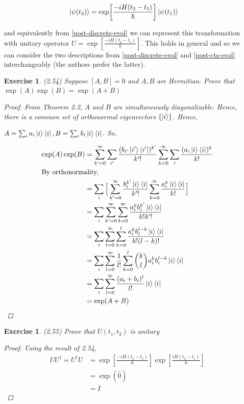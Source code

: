 \documentclass[11pt]{article}
\newcommand\0{\mathbf{0}}
\newcommand\<{\langle}
\renewcommand\>{\rangle}
\newtheorem{exercise}[theorem]{Exercise}
\begin{document}
\begin{align*}
	\ket{\psi(t_2)} &= \exp[\frac{-iH(t_2 - t_1)}{\hbar}] \ket{\psi(t_1)}
\end{align*}

and equivalently from \ref{post-discrete-evol} we can represent this transformation with unitary operator $U = \exp[\frac{-iH(t_2 - t_1)}{\hbar}]$. This holds in general and so we can consider the two descriptions from \ref{post-discrete-evol} and \ref{post-cts-evol} interchangeably (the authors prefer the latter). 

\begin{exercise}
(2.54) Suppose $[A, B] = 0$ and $A, B$ are Hermitian. Prove that $\exp(A)\exp(B) = \exp(A + B)$

\begin{proof}
	From Theorem 2.2, $A$ and $B$ are simultaneously diagonalizable. Hence, there is a common set of orthonormal eigenvectors $\{ \ket{i} \}$. Hence,
	
	$A = \sum_i a_i \ket{i}\bra{i}, B = \sum_i b_i \ket{i}\bra{i}$. So, 
	
	\begin{align*}
	\exp(A)\exp(B) &= \sum_{k'=0}^\infty\sum_{i'} \frac{(b_{i'} \ket{i'}\bra{i'})^{k'}}{k'!}\sum_{k=0}^\infty\sum_{i} \frac{(a_i \ket{i}\bra{i})^k}{k!} \\
	\intertext{By orthonormality,}
	&= \sum_{i}\Big[\sum_{k'=0}^\infty \frac{b_i^{k'} \ket{i}\bra{i}}{k'!}\sum_{k=0}^\infty \frac{a_i^k \ket{i}\bra{i}}{k!}\Big] \\
	&= \sum_{i}\sum_{k'=0}^\infty\sum_{k=0}^\infty \frac{a_i^k b_i^{k'} \ket{i}\bra{i}}{k!k'!}\\
	&= \sum_{i}\sum_{l=0}^\infty\sum_{k=0}^l \frac{a_i^k b_i^{l-k} \ket{i}\bra{i}}{k!(l-k)!}\\
	&= \sum_{i}\sum_{l=0}^\infty \frac{1}{l!}\sum_{k=0}^l \binom{k}{l} a_i^k b_i^{l-k} \ket{i}\bra{i} \\
	&= \sum_{i}\sum_{l=0}^\infty \frac{(a_i +b_i)^l}{l!} \ket{i}\bra{i} \\
	&= \exp(A + B)
	\end{align*}
\end{proof}
\end{exercise}

\begin{exercise}
(2.55) Prove that $U(t_1, t_2)$ is unitary	
\begin{proof}

Using the result of 2.54, 
	\begin{align*}
	UU^\dag = U^\dag U &= \exp[\frac{-iH(t_2 - t_1)}{\hbar}]\exp[\frac{iH(t_2 - t_1)}{\hbar}] \\
	&= 	\exp(\hat{0}) \\
	&= 	I
	\end{align*}
\end{proof}
\end{exercise}
\end{document}
